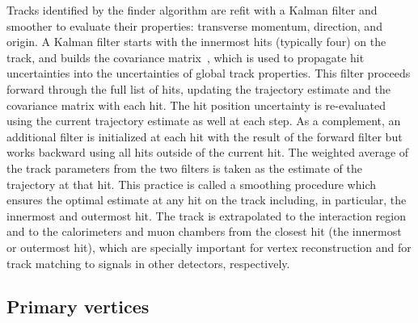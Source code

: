 Tracks identified by the finder algorithm are refit with a Kalman filter and smoother to evaluate their properties:
transverse momentum, direction, and origin.
A Kalman filter starts with the innermost hits (typically four) on the track, 
and builds the covariance matrix~\cite{Strandlie:927379}, 
which is used to propagate hit uncertainties into the uncertainties of global track properties. 
This filter proceeds forward through the full list of hits, 
updating the trajectory estimate and the covariance matrix with each hit.
The hit position uncertainty is re-evaluated using the current trajectory estimate as well at each step. 
As a complement, an additional filter is initialized at each hit with the result of the forward filter 
but works backward using all hits outside of the current hit. 
The weighted average of the track parameters from the two filters is taken as the estimate of the trajectory at that hit.
This practice is called a smoothing procedure which ensures the optimal estimate at any hit on the track
including, in particular, the innermost and outermost hit.
The track is extrapolated to the interaction region and to the calorimeters and muon chambers from the closest hit (the innermost or outermost hit),
which are specially important for vertex reconstruction and for track matching to signals in other detectors, respectively.


\subsection{Primary vertices}\label{sec:reco_pv}

